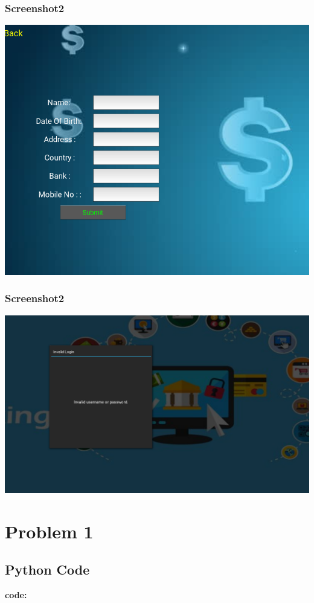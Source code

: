 \documentclass[12pt]{article}
\begin{document}
\subsubsection{Screenshot2}
\includegraphics[width=\linewidth]{lab11_2.png}
\subsubsection{Screenshot2}
\includegraphics[width=\linewidth]{lab11_3.png}
\newpage
 \appendix
   \appendixpage
   \addappheadtotoc
  \section*{Problem 1}
  \subsection*{Python Code}
  {\large \textbf{code:}}
  
\end{document}
